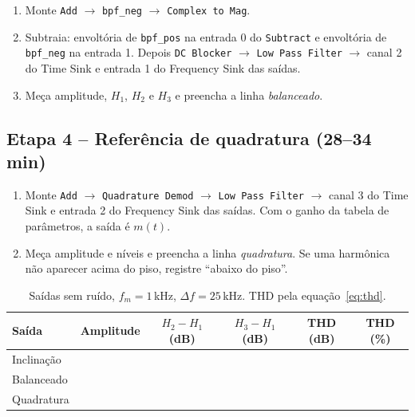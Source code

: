 \documentclass[11pt,a4paper]{article}
\begin{document}
\begin{instrucao}
\begin{enumerate}[label=\arabic*.]
  \item Monte \texttt{Add} $\to$ \texttt{bpf\_neg} $\to$ \texttt{Complex to Mag}.
  \item Subtraia: envoltória de \texttt{bpf\_pos} na entrada 0 do \texttt{Subtract}
    e envoltória de \texttt{bpf\_neg} na entrada 1. Depois
    \texttt{DC Blocker} $\to$ \texttt{Low Pass Filter} $\to$ canal 2 do Time Sink
    e entrada 1 do Frequency Sink das saídas.
  \item Meça amplitude, $H_1$, $H_2$ e $H_3$ e preencha a linha
    \textit{balanceado}.
\end{enumerate}
\end{instrucao}

\subsection*{Etapa 4 -- Referência de quadratura (28--34 min)}

\begin{instrucao}
\begin{enumerate}[label=\arabic*.]
  \item Monte \texttt{Add} $\to$ \texttt{Quadrature Demod} $\to$
    \texttt{Low Pass Filter} $\to$ canal 3 do Time Sink e entrada 2 do Frequency
    Sink das saídas. Com o ganho da tabela de parâmetros, a saída é $m(t)$.
  \item Meça amplitude e níveis e preencha a linha \textit{quadratura}. Se uma
    harmônica não aparecer acima do piso, registre ``abaixo do piso''.
\end{enumerate}
\end{instrucao}

\begin{table}[H]
  \centering
  \begin{tabular}{l c c c c c}
    \toprule
    Saída & Amplitude & $H_2-H_1$ (dB) & $H_3-H_1$ (dB) & THD (dB) & THD (\%) \\
    \midrule
    Inclinação & & & & & \\
    Balanceado & & & & & \\
    Quadratura & & & & & \\
    \bottomrule
  \end{tabular}
  \caption{Saídas sem ruído, $f_m = 1$\,kHz, $\Delta f = 25$\,kHz. THD pela
    equação~\eqref{eq:thd}.}
  \label{tab:harm}
\end{table}
\end{document}
